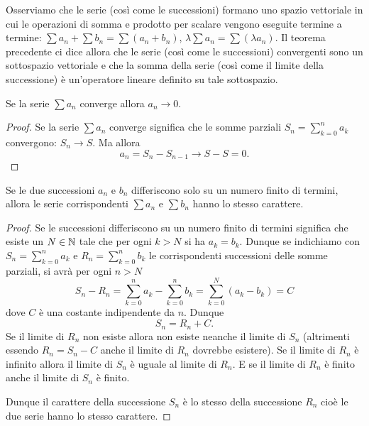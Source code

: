 Osserviamo che le serie (così come le successioni) formano uno spazio
vettoriale in cui le operazioni di somma e prodotto per scalare vengono
eseguite termine a termine: $\sum a_n + \sum b_n = \sum (a_n + b_n)$,
$\lambda \sum a_n = \sum (\lambda a_n)$.
Il teorema precedente ci dice allora che le serie (così come le successioni)
convergenti sono un sottospazio vettoriale e che la somma della serie (così come il limite della successione) è un'operatore lineare definito su tale sottospazio.

\begin{theorem}
\mymark{***}
Se la serie $\sum a_n$ converge allora $a_n \to 0$.
\end{theorem}
%
\begin{proof}
\mymark{***}
Se la serie $\sum a_n$ converge significa che le somme parziali
$S_n = \sum_{k=0}^n a_k$ convergono: $S_n \to S$. Ma allora
\[
  a_n = S_n - S_{n-1} \to S - S = 0.
\]
\end{proof}

\begin{theorem}%
%
%
%
%
Se le due successioni $a_n$ e $b_n$ differiscono solo su un numero finito
%
di termini, allora le serie corrispondenti $\sum a_n$ e $\sum b_n$ hanno lo stesso carattere.
\end{theorem}
%
\begin{proof}
Se le successioni differiscono su un numero finito di termini significa
che esiste un $N\in {\mathbb N}$ tale che per ogni $k>N$ si ha $a_k=b_k$.
Dunque se indichiamo con $S_n = \sum_{k=0}^n a_k$ e $R_n = \sum_{k=0}^n b_k$
le corrispondenti successioni delle somme parziali, si avrà per ogni $n>N$
\[
  S_n - R_n
    = \sum_{k=0}^n a_k - \sum_{k=0}^n b_k
    = \sum_{k=0}^N (a_k - b_k) = C
\]
dove $C$ è una costante indipendente da $n$. Dunque
\[
  S_n = R_n + C.
\]
Se il limite di $R_n$ non esiste allora non esiste neanche il limite
di $S_n$ (altrimenti essendo $R_n = S_n -C$ anche il limite di $R_n$ dovrebbe esistere). Se il limite di $R_n$ è infinito allora il limite di $S_n$ è uguale
al limite di $R_n$. E se il limite di $R_n$ è finito anche il limite di $S_n$ è finito.

Dunque il carattere della successione $S_n$ è lo stesso della successione $R_n$
cioè le due serie hanno lo stesso carattere.
\end{proof}

